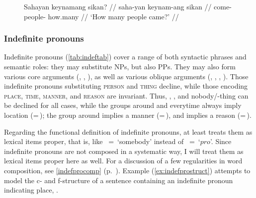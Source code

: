 \begin{figure}
\ex\label{ex:sikanadj}%
\begingl
	\gla Sahayan keynamang sikan? //
	\glb saha-yan keynam-ang sikan //
	\glc come-\TplM{} people-\Aarg{} how.many //
	\glft `How many people came?' //
\endgl
\xe
\end{figure}


\subsubsection{Indefinite pronouns}

Indefinite pronouns (\autoref{tab:indeftab}) cover a range of both syntactic
phrases and semantic roles: they may substitute NPs, but also PPs. They may
also form various core arguments (\Subj{}, \Obj{}, ), as well as
various oblique arguments (\Possr{}, , , ).
Those indefinite pronouns substituting \textsc{person} and \textsc{thing}
decline, while those encoding \textsc{place}, \textsc{time}, \textsc{manner},
and \textsc{reason} are invariant. Thus, , , and
 {nobody/\mbox{-thing}} can be declined for all cases, while
the groups around  and 
{everytime} always imply location (=\,\Loc{}); the group around
 implies a manner (=\,\Ins{}), and
 implies a reason (=\,\Caus{}).

Regarding the functional definition of indefinite pronouns, at least
\citet{dalrymple2001} treats them as lexical items proper, that is, like
\ups{\Pred{}}~=~`somebody' instead of \ups{\Pred{}}~=~`$pro$'. Since indefinite
pronouns are not composed in a systematic way, I will treat them as lexical
items proper here as well. For a discussion of a few regularities in word
composition, see \autoref{indefprocomp} (p.~\pageref{indefprocomp}). Example
(\ref{ex:indefprostruct}) attempts to model the c- and f-structure of a sentence
containing an indefinite pronoun indicating place,
.

